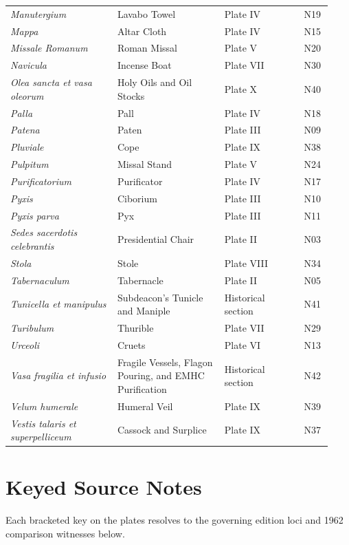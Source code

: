 {\begin{longtable}{>{\raggedright\arraybackslash}p{0.31\linewidth}>{\raggedright\arraybackslash}p{0.31\linewidth}>{\raggedright\arraybackslash}p{0.23\linewidth}>{\raggedright\arraybackslash}p{0.08\linewidth}}
\textit{Manutergium} & Lavabo Towel & Plate IV & N19 \\
\textit{Mappa} & Altar Cloth & Plate IV & N15 \\
\textit{Missale Romanum} & Roman Missal & Plate V & N20 \\
\textit{Navicula} & Incense Boat & Plate VII & N30 \\
\textit{Olea sancta et vasa oleorum} & Holy Oils and Oil Stocks & Plate X & N40 \\
\textit{Palla} & Pall & Plate IV & N18 \\
\textit{Patena} & Paten & Plate III & N09 \\
\textit{Pluviale} & Cope & Plate IX & N38 \\
\textit{Pulpitum} & Missal Stand & Plate V & N24 \\
\textit{Purificatorium} & Purificator & Plate IV & N17 \\
\textit{Pyxis} & Ciborium & Plate III & N10 \\
\textit{Pyxis parva} & Pyx & Plate III & N11 \\
\textit{Sedes sacerdotis celebrantis} & Presidential Chair & Plate II & N03 \\
\textit{Stola} & Stole & Plate VIII & N34 \\
\textit{Tabernaculum} & Tabernacle & Plate II & N05 \\
\textit{Tunicella et manipulus} & Subdeacon's Tunicle and Maniple & Historical section & N41 \\
\textit{Turibulum} & Thurible & Plate VII & N29 \\
\textit{Urceoli} & Cruets & Plate VI & N13 \\
\textit{Vasa fragilia et infusio} & Fragile Vessels, Flagon Pouring, and EMHC Purification & Historical section & N42 \\
\textit{Velum humerale} & Humeral Veil & Plate IX & N39 \\
\textit{Vestis talaris et superpelliceum} & Cassock and Surplice & Plate IX & N37 \\
\bottomrule
\end{longtable}}

\clearpage
\section{Keyed Source Notes}
Each bracketed key on the plates resolves to the governing edition loci and 1962 comparison witnesses below.

